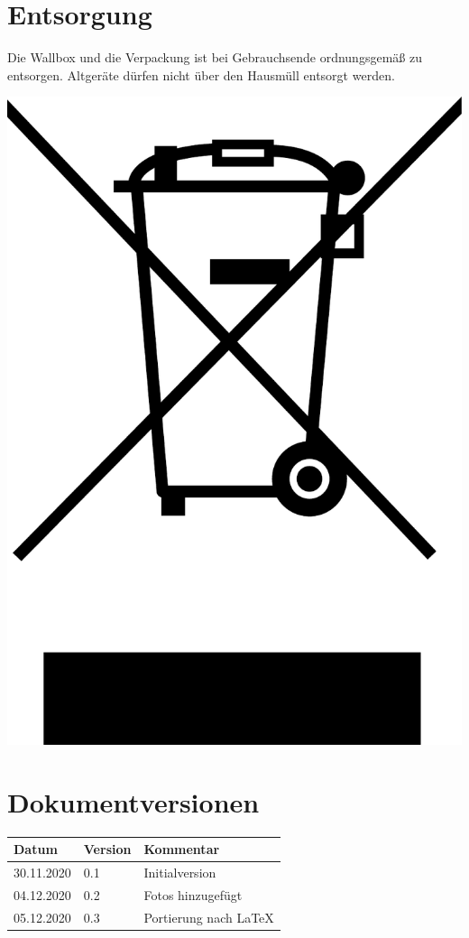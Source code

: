 \documentclass[a4paper,10pt]{article}
\begin{document}
\begin{multicols*}{2}
	\section{Entsorgung}
	Die Wallbox und die Verpackung ist bei Gebrauchsende ordnungsgemäß zu
	entsorgen. Altgeräte dürfen nicht über den Hausmüll entsorgt werden.

	\includegraphics[width=0.2\linewidth]{./img/resized/weee.pdf}

	\section{Dokumentversionen}
	\begin{tabular}{lll}
		\toprule
		Datum      & Version & Kommentar              \\
		\midrule
		30.11.2020 & 0.1     & Initialversion         \\
		04.12.2020 & 0.2     & Fotos hinzugefügt      \\
		05.12.2020 & 0.3     & Portierung nach \LaTeX \\
		\bottomrule
	\end{tabular}

\end{multicols*}

\end{document}
